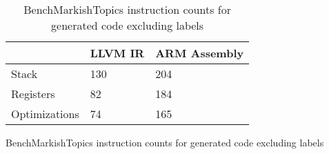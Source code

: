 \begin{table}[h!]
\centering
\begin{tabular}{p{}p{}p{}}
  \hline
 & LLVM IR & ARM Assembly \\ 
  \hline
Stack & 130 & 204 \\ 
  Registers &  82 & 184 \\ 
  Optimizations &  74 & 165 \\ 
   \hline
\end{tabular}
\caption{BenchMarkishTopics instruction counts for generated code excluding labels}
\caption{BenchMarkishTopics instruction counts for generated code excluding labels}
\end{table}
